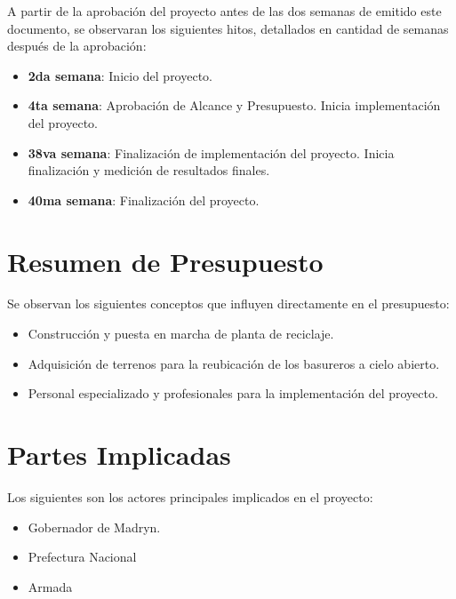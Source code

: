 \documentclass[a4paper,11pt]{article}
\begin{document}
A partir de la aprobación del proyecto antes de las dos semanas de emitido este
documento, se observaran los siguientes hitos, detallados en cantidad de
semanas después de la aprobación:

\begin{itemize}

  \item \textbf{2da semana}: Inicio del proyecto.

  \item \textbf{4ta semana}: Aprobación de Alcance y Presupuesto. Inicia
    implementación del proyecto.

  \item \textbf{38va semana}: Finalización de implementación del proyecto.
    Inicia finalización y medición de resultados finales.

  \item \textbf{40ma semana}: Finalización del proyecto.

\end{itemize}

\section{Resumen de Presupuesto}

Se observan los siguientes conceptos que influyen directamente en el
presupuesto:

\begin{itemize}

  \item Construcción y puesta en marcha de planta de reciclaje.

  \item Adquisición de terrenos para la reubicación de los basureros a cielo
    abierto.

  \item Personal especializado y profesionales para la implementación del
    proyecto.

\end{itemize}

\section{Partes Implicadas}

Los siguientes son los actores principales implicados en el proyecto:

\begin{itemize}

  \item Gobernador de Madryn.

  \item Prefectura Nacional

  \item Armada

\end{itemize}
\end{document}
